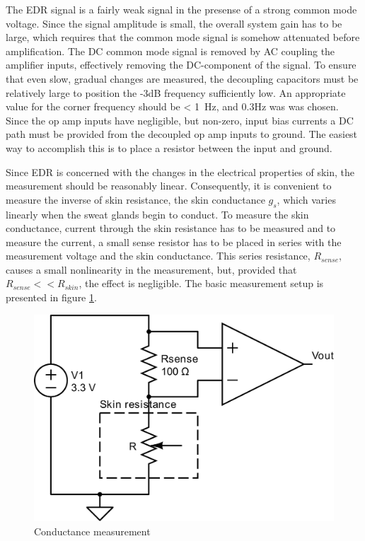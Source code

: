 \documentclass[a4paper,11pt]{article}
\begin{document}
The EDR signal is a fairly weak signal in the presense of a strong
common mode voltage. Since the signal amplitude is small, the overall
system gain has to be large, which requires that the common mode
signal is somehow attenuated before amplification. The DC common mode
signal is removed by AC coupling the amplifier inputs, effectively
removing the DC-component of the signal. To ensure that even slow,
gradual changes are measured, the decoupling capacitors must be
relatively large to position the -3dB frequency sufficiently low. An
appropriate value for the corner frequency should be < \SI{1}{\hertz},
and 0.3Hz was was chosen. Since the op amp inputs have negligible, but
non-zero, input bias currents a DC path must be provided from the
decoupled op amp inputs to ground. The easiest way to accomplish this
is to place a resistor between the input and ground.

Since EDR is concerned with the changes in the electrical properties
of skin, the measurement should be reasonably linear. Consequently, it
is convenient to measure the inverse of skin resistance, the skin
conductance $g_s$, which varies linearly when the sweat glands begin
to conduct. To measure the skin conductance, current through the skin
resistance has to be measured and to measure the current, a small
sense resistor has to be placed in series with the measurement voltage
and the skin conductance. This series resistance, $R_{sense}$, causes
a small nonlinearity in the measurement, but, provided that $R_{sense}
<< R_{skin}$, the effect is negligible. The basic measurement setup is
presented in figure \ref{fig:meas-setup}.
\begin{figure}[htb]  
  \caption{Conductance measurement}
  \label{fig:meas-setup}
  \includegraphics[width=\linewidth]{conductance_measurement}
\end{figure}
\end{document}
